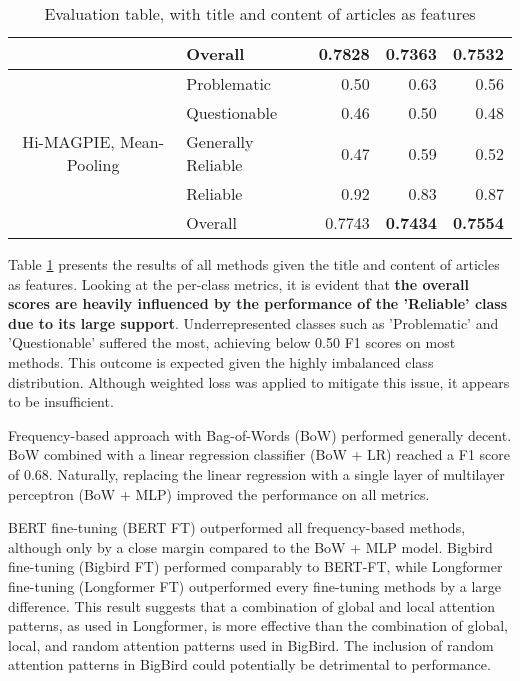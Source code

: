 \begin{table}[htbp]
\begin{longtable}{| c | l | r | r | r |}
                                                          & Overall            & \textbf{0.7828}    & 0.7363          & 0.7532          \\
        \hline
        \multirow{5}{*}{Hi-MAGPIE, Mean-Pooling}          & Problematic        & 0.50               & 0.63            & 0.56            \\
                                                          & Questionable       & 0.46               & 0.50            & 0.48            \\
                                                          & Generally Reliable & 0.47               & 0.59            & 0.52            \\
                                                          & Reliable           & 0.92               & 0.83            & 0.87            \\\cline{2-5}
                                                          & Overall            & 0.7743             & \textbf{0.7434} & \textbf{0.7554} \\
        \hline
    \end{longtable}
    \caption{Evaluation table, with title and content of articles as features}
    \label{table:eval}
\end{table}

Table \ref{table:eval} presents the results of all methods given the title and content of articles as features. Looking at the per-class metrics, it is evident that \textbf{the overall scores are heavily influenced by the performance of the 'Reliable' class due to its large support}. Underrepresented classes such as 'Problematic' and 'Questionable' suffered the most, achieving below 0.50 F1 scores on most methods. This outcome is expected given the highly imbalanced class distribution. Although weighted loss was applied to mitigate this issue, it appears to be insufficient.

Frequency-based approach with Bag-of-Words (BoW) performed generally decent. BoW combined with a linear regression classifier (BoW + LR) reached a F1 score of 0.68.  Naturally, replacing the linear regression with a single layer of multilayer perceptron (BoW + MLP) improved the performance on all metrics.

BERT fine-tuning (BERT FT) outperformed all frequency-based methods, although only by a close margin compared to the BoW + MLP model. Bigbird fine-tuning (Bigbird FT) performed comparably to BERT-FT, while Longformer fine-tuning (Longformer FT) outperformed every fine-tuning methods by a large difference. This result suggests that a combination of global and local attention patterns, as used in Longformer, is more effective than the combination of global, local, and random attention patterns used in BigBird. The inclusion of random attention patterns in BigBird could potentially be detrimental to performance.

